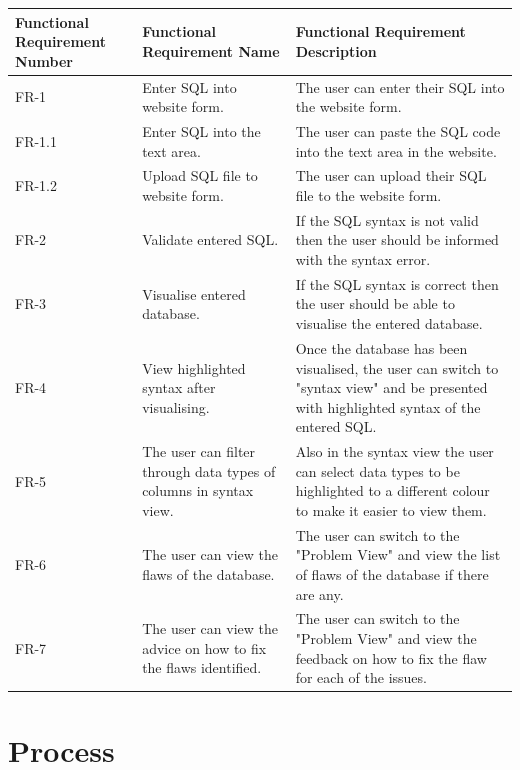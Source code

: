 \begin{center}
	\setlength\extrarowheight{2pt}
	\begin{tabularx}{\textwidth}{|X|X|X|}
		
		\hline
		\textbf{Functional Requirement Number} & \textbf{Functional Requirement Name} & \textbf{Functional Requirement Description} \\
		\hline
		FR-1 & Enter SQL into website form. & The user can enter their SQL into the website form. \\
		\hline
		FR-1.1 & Enter SQL into the text area. & The user can paste the SQL code into the text area in the website. \\
		\hline
		FR-1.2 & Upload SQL file to website form. & The user can upload their SQL file to the website form. \\
		\hline
		FR-2 & Validate entered SQL. & If the SQL syntax is not valid then the user should be informed with the syntax error. \\
		\hline
		FR-3 & Visualise entered database. & If the SQL syntax is correct then the user should be able to visualise the entered database. \\
		\hline
		FR-4 & View highlighted syntax after visualising. & Once the database has been visualised, the user can switch to "syntax view" and be presented with highlighted syntax of the entered SQL. \\
		\hline
		FR-5 & The user can filter through data types of columns in syntax view. & Also in the syntax view the user can select data types to be highlighted to a different colour to make it easier to view them. \\
		\hline
		FR-6 & The user can view the flaws of the database. & The user can switch to the "Problem View" and view the list of flaws of the database if there are any. \\
		\hline
		FR-7 & The user can view the advice on how to fix the flaws identified. & The user can switch to the "Problem View" and view the feedback on how to fix the flaw for each of the issues. \\
		\hline
	\end{tabularx}
\end{center}

\newpage

\section{Process}
\label{sec:process}

